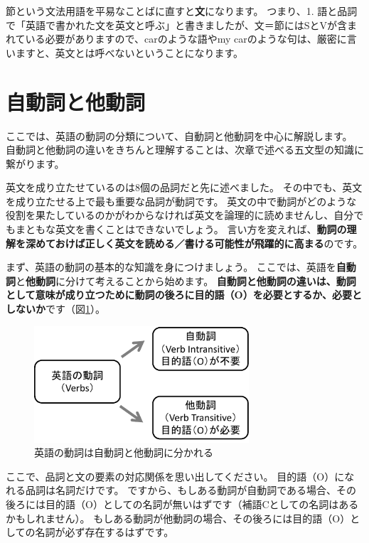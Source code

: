 \documentclass[12pt,titlepage]{jsarticle}
\begin{document}
  節という文法用語を平易なことばに直すと{\bf 文}になります。
  つまり、1. 語と品詞で「英語で書かれた文を英文と呼ぶ」と書きましたが、文＝節にはSとVが含まれている必要がありますので、carのような語やmy carのような句は、厳密に言いますと、英文とは呼べないということになります。

  \newpage
 \section{自動詞と他動詞}
 ここでは、英語の動詞の分類について、自動詞と他動詞を中心に解説します。
 自動詞と他動詞の違いをきちんと理解することは、次章で述べる五文型の知識に繋がります。

 英文を成り立たせているのは8個の品詞だと先に述べました。
 その中でも、英文を成り立たせる上で最も重要な品詞が動詞です。
 英文の中で動詞がどのような役割を果たしているのかがわからなければ英文を論理的に読めませんし、自分でもまともな英文を書くことはできないでしょう。
 言い方を変えれば、{\bf 動詞の理解を深めておけば正しく英文を読める／書ける可能性が飛躍的に高まる}のです。

 まず、英語の動詞の基本的な知識を身につけましょう。
 ここでは、英語を{\bf 自動詞}と{\bf 他動詞}に分けて考えることから始めます。
 {\bf 自動詞と他動詞の違いは、動詞として意味が成り立つために動詞の後ろに目的語（O）を必要とするか、必要としないか}です（図\ref{fig7}）。
  \begin{figure}[htbp]
   \begin{center}
    \includegraphics[width=8cm]{./figure/fig7.pdf}
    \caption{英語の動詞は自動詞と他動詞に分かれる}
    \label{fig7}
   \end{center}
  \end{figure}

  ここで、品詞と文の要素の対応関係を思い出してください。
  目的語（O）になれる品詞は名詞だけです。
  ですから、もしある動詞が自動詞である場合、その後ろには目的語（O）としての名詞が無いはずです（補語Cとしての名詞はあるかもしれません）。
  もしある動詞が他動詞の場合、その後ろには目的語（O）としての名詞が必ず存在するはずです。
\end{document}
